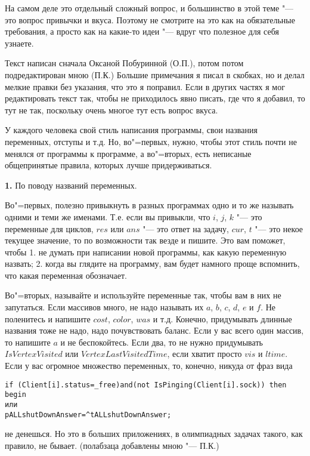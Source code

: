 На самом деле это отдельный сложный вопрос, и большинство в этой теме "--- это вопрос привычки и вкуса. Поэтому не смотрите на это как на обязательные требования, а просто как на какие-то идеи "--- вдруг что полезное для себя узнаете.

Текст написан сначала Оксаной Побуринной (О.П.), потом потом подредактирован мною (П.К.) Большие примечания я писал в скобках, 
но и делал мелкие правки без указания, что это я поправил. Если в других частях я мог 
редактировать текст так, чтобы не приходилось явно писать, где что я добавил, то тут не так, 
поскольку очень многое тут есть вопрос вкуса. 

У каждого человека свой стиль написания программы, свои названия переменных, отступы и т.д. Но, во"=первых, 
нужно, чтобы этот стиль почти не менялся от программы к программе, а во"=вторых, есть неписаные общепринятые 
правила, которых лучше придерживаться. 

\textbf{1.} По поводу названий переменных.

 Во"=первых, полезно привыкнуть в разных программах одно и 
то же называть одними и теми же 
именами. Т.е. если вы привыкли, что $i$, $j$, $k$ "--- это переменные для циклов, $res$ или $ans$ "--- это ответ на задачу,
$cur$, $t$ "--- это некое текущее значение, то по возможности так везде и пишите. Это вам поможет, 
чтобы 1. не думать при написании новой программы, как какую переменную назвать; 2. когда вы глядите на 
программу, вам будет намного проще вспомнить, что какая переменная обозначает.

Во"=вторых, называйте и используйте переменные так, чтобы вам в них не запутаться. Если массивов 
много, не надо называть их $a$, $b$, $c$, $d$, $e$ и $f$. Не  
поленитесь и напишите $cost$, $color$, $was$ и т.д. Конечно, придумывать длинные названия тоже не 
надо, надо почувствовать баланс. Если у вас всего один массив, то напишите $a$ и не беспокойтесь. 
Если два, то не нужно придумывать $IsVertexVisited$ или $VertexLastVisitedTime$, если хватит просто 
$vis$ и $ltime$. Если у вас огромное множество переменных, то, конечно, никуда от фраз вида
\begin{codesampleo}\begin{verbatim}
if (Client[i].status=_free)and(not IsPinging(Client[i].sock)) then begin
или
pALLshutDownAnswer=^tALLshutDownAnswer;
\end{verbatim}
\end{codesampleo}
\noindent не денешься. Но это в больших приложениях, в олимпиадных задачах такого, как правило, не бывает. (полабзаца 
добавлены мною "--- П.К.)

